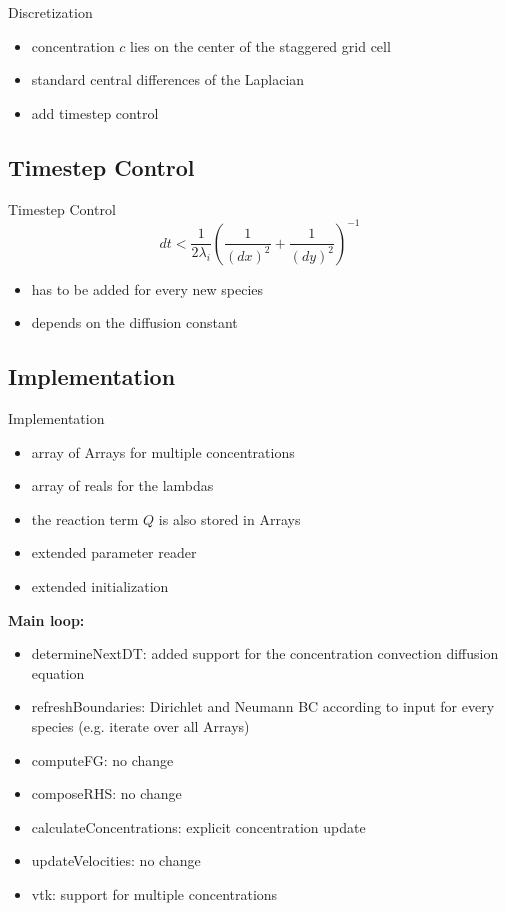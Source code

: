 \documentclass[t,mathserif]{beamer}
\begin{document}
\begin{frame}[allowframebreaks]{Discretization}
\begin{itemize}
	\item concentration $c$ lies on the center of the staggered grid cell
	\item standard central differences of the Laplacian
	\item add timestep control
\end{itemize}
\end{frame}

\subsection{Timestep Control}
\begin{frame}{Timestep Control}
	\begin{equation}
			dt < \frac{1}{2 \lambda_i} \left ( \frac{1}{(dx)^2} +
			\frac{1}{(dy)^2} \right ) ^{-1}
	\end{equation}
	\begin{itemize}
		\item has to be added for every new species
		\item depends on the diffusion constant
	\end{itemize}
\end{frame}

\subsection{Implementation}
\begin{frame}[allowframebreaks]{Implementation}
\begin{itemize}
	\item array of Arrays for multiple concentrations
	\item array of reals for the lambdas
	\item the reaction term $Q$ is also stored in Arrays
	\item extended parameter reader
	\item extended initialization
\end{itemize}
\framebreak
\textbf{Main loop:}
\begin{itemize}
	\item determineNextDT: added support for the concentration convection diffusion equation
    \item refreshBoundaries: Dirichlet and Neumann BC according to input for every species (e.g. iterate over all Arrays)
    \item computeFG: no change
    \item composeRHS: no change
    \item calculateConcentrations: explicit concentration update
    \item updateVelocities: no change
    \item vtk: support for multiple concentrations
\end{itemize}
\end{frame}
\end{document}
